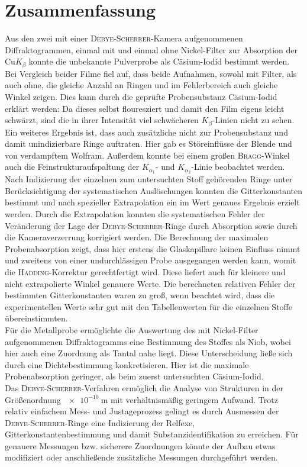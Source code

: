 \documentclass[a4paper,twoside,final]{article}
\begin{document}
\section{Zusammenfassung}
Aus den zwei mit einer \textsc{Debye-Scherrer}-Kamera aufgenommenen Diffraktogrammen, einmal mit und einmal ohne Nickel-Filter zur Absorption der Cu$K_{\beta}$ konnte die unbekannte Pulverprobe als Cäsium-Iodid bestimmt werden. \\
Bei Vergleich beider Filme fiel auf, dass beide Aufnahmen, sowohl mit Filter, als auch ohne, die gleiche Anzahl an Ringen und im Fehlerbereich auch gleiche Winkel zeigen. Dies kann durch die geprüfte Probensubstanz Cäsium-Iodid erklärt werden: Da dieses selbst flouresziert und damit den Film eigens leicht schwärzt, sind die in ihrer Intensität viel schwächeren $K_\beta$-Linien nicht zu sehen. Ein weiteres Ergebnis ist, dass auch zusätzliche nicht zur Probensubstanz und damit unindizierbare Ringe auftraten. Hier gab es Störeinflüsse der Blende und von verdampftem Wolfram. Außerdem konnte bei einem großen \textsc{Bragg}-Winkel auch die Feinstrukturaufspaltung der $K_{\alpha_1}$- und $K_{\alpha_2}$-Linie beobachtet werden.
Nach Indizierung der einzelnen zum untersuchten Stoff gehörenden Ringe unter Berücksichtigung der systematischen Auslöschungen konnten die Gitterkonstanten bestimmt und nach spezieller Extrapolation ein im Wert genaues Ergebnis erzielt werden. Durch die Extrapolation konnten die systematischen Fehler der Veränderung der Lage der \textsc{Debye-Scherrer}-Ringe durch Absorption sowie durch die Kameraverzerrung korrigiert werden. Die Berechnung der maximalen Probenabsorption zeigt, dass hier erstens die Glaskapillare keinen Einfluss nimmt und zweitens von einer undurchlässigen Probe ausgegangen werden kann, womit die \textsc{Hadding}-Korrektur gerechtfertigt wird. Diese liefert auch für kleinere und nicht extrapolierte Winkel genauere Werte. Die berechneten relativen Fehler der bestimmten Gitterkonstanten waren zu groß, wenn beachtet wird, dass die experimentellen Werte sehr gut mit den Tabellenwerten für die einzelnen Stoffe übereinstimmten.\\
Für die Metallprobe ermöglichte die Auswertung des mit Nickel-Filter aufgenommenen Diffraktogramms eine Bestimmung des Stoffes als Niob, wobei hier auch eine Zuordnung als Tantal nahe liegt. Diese Unterscheidung ließe sich durch eine Dichtebestimmung konkretisieren. Hier ist die maximale Probenabsorption geringer, als beim zuerst untersuchten Cäsium-Iodid.\\
Das \textsc{Debye-Scherrer}-Verfahren ermöglich die Analyse von Strukturen in der Größenordnung $\SI{e-10}{\metre}$ mit verhältnismäßig geringem Aufwand. Trotz relativ einfachem Mess- und Justageprozess gelingt es durch Ausmessen der \textsc{Debye-Scherrer}-Ringe eine Indizierung der Relfexe, Gitterkonstantenbestimmung und damit Substanzidentifikation zu erreichen. Für genauere Messungen bzw. sicherere Zuordnungen könnte der Aufbau etwas modifiziert oder anschließende zusätzliche Messungen durchgeführt werden.
\end{document}
